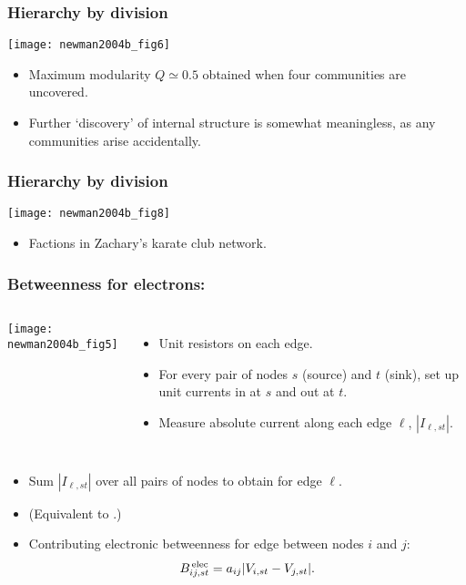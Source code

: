 \begin{frame}
  \frametitle{Hierarchy by division}

  \texttt{[image: newman2004b\_fig6]}

  \begin{itemize}
  \item<1->
    Maximum modularity $Q \simeq 0.5$ obtained
    when four communities are uncovered.
  \item<2->
    Further `discovery' of internal structure
    is somewhat meaningless, as any communities
    arise accidentally.
  \end{itemize}

\end{frame}


\begin{frame}
  \frametitle{Hierarchy by division}

  \texttt{[image: newman2004b\_fig8]}

  \begin{itemize}
  \item<1-> Factions in Zachary's karate club network.\cite{zachary1977a}
  \end{itemize}

\end{frame}

\begin{frame}
  \frametitle{Betweenness for electrons:}

    \begin{columns}
      \texttt{[image: newman2004b\_fig5]}
      \begin{itemize}
      \item<1->
        Unit resistors on each edge.
      \item<2->
        For every pair of nodes $s$ (source) and $t$ (sink),
        set up \alert{unit currents} in at $s$ and out at $t$.
      \item<3->
        Measure absolute current along each edge $\ell$, $|I_{\ell,st}|$.
      \end{itemize}
    \end{columns}
    \begin{itemize}
      \item<4->
        Sum $|I_{\ell,st}|$ over all pairs of nodes
        to obtain  
        for edge $\ell$.
      \item<5->
        (Equivalent to .)
      \item<6->
        Contributing electronic betweenness
        for edge between nodes $i$ and $j$:
        $$
        B^{\, \textnormal{elec}}_{ij,st}
        = 
        a_{ij} | V_{i,st} - V_{j,st} |.
        $$
      \end{itemize}

\end{frame}

